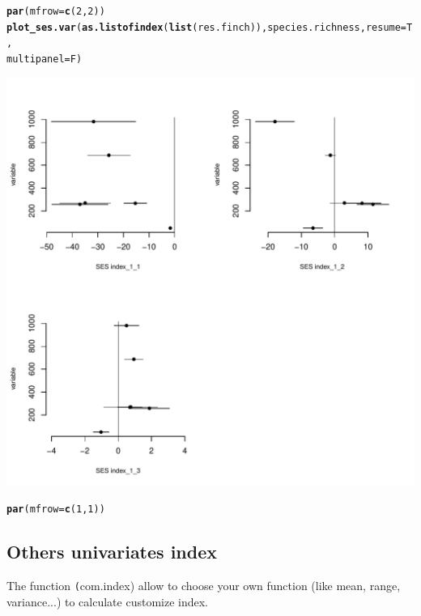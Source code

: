 \documentclass[12pt]{article}\usepackage[]{graphicx}\usepackage[]{color}
\makeatletter
\def\maxwidth{ %
  \ifdim\Gin@nat@width>\linewidth
    \linewidth
  \else
    \Gin@nat@width
  \fi
}
\newcommand{\hlnum}[1]{\textcolor[rgb]{0.686,0.059,0.569}{#1}}%
\newcommand{\hlstd}[1]{\textcolor[rgb]{0.345,0.345,0.345}{#1}}%
\newcommand{\hlkwc}[1]{\textcolor[rgb]{0.333,0.667,0.333}{#1}}%
\newcommand{\hlkwd}[1]{\textcolor[rgb]{0.737,0.353,0.396}{\textbf{#1}}}%
\newenvironment{kframe}{%
 \def\at@end@of@kframe{}%
 \ifinner\ifhmode%
  \def\at@end@of@kframe{\end{minipage}}%
  \begin{minipage}{\columnwidth}%
 \fi\fi%
 \def\FrameCommand##1{\hskip\@totalleftmargin \hskip-\fboxsep
 \colorbox{shadecolor}{##1}\hskip-\fboxsep
     \hskip-\linewidth \hskip-\@totalleftmargin \hskip\columnwidth}%
 \MakeFramed {\advance\hsize-\width
   \@totalleftmargin\z@ \linewidth\hsize
   \@setminipage}}%
 {\par\unskip\endMakeFramed%
 \at@end@of@kframe}
\newenvironment{knitrout}{}{} %
\newcommand{\code}[1]{{{\tt #1}}}
\makeatother
\begin{document}
\begin{knitrout}
\color{fgcolor}\begin{kframe}
\begin{alltt}
\hlkwd{par}\hlstd{(}\hlkwc{mfrow} \hlstd{=} \hlkwd{c}\hlstd{(}\hlnum{2}\hlstd{,} \hlnum{2}\hlstd{))}
\hlkwd{plot_ses.var}\hlstd{(}\hlkwd{as.listofindex}\hlstd{(}\hlkwd{list}\hlstd{(res.finch)), species.richness,} \hlkwc{resume} \hlstd{= T,}
    \hlkwc{multipanel} \hlstd{= F)}
\end{alltt}
\end{kframe}
\includegraphics[width=\maxwidth]{figure/unnamed-chunk-27} 
\begin{kframe}\begin{alltt}
\hlkwd{par}\hlstd{(}\hlkwc{mfrow} \hlstd{=} \hlkwd{c}\hlstd{(}\hlnum{1}\hlstd{,} \hlnum{1}\hlstd{))}
\end{alltt}
\end{kframe}
\end{knitrout}



\newpage
\subsection{Others univariates index}

The function \code(com.index) allow to choose your own function (like mean, range, variance...) to calculate customize index.
\end{document}
